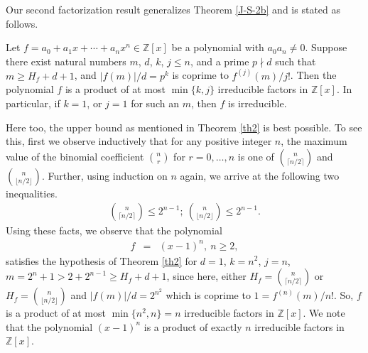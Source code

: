 \documentclass[12pt,reqno]{amsart}%
\begin{document}
Our second factorization result generalizes Theorem \ref{J-S-2b} and is stated as follows.
\begin{theorem}\label{th2}
Let $f=a_0+a_1x+\cdots +a_nx^n\in \mathbb Z[x]$ be a polynomial with $a_0a_n\neq 0$. Suppose there exist  natural numbers $m$, $d$, $k$, $j\leq n$, and a prime $p\nmid d$ such that $m\geq H_f+d+1$, and $|f(m)|/d=p^k$ is coprime to $f^{(j)}(m)/j!$. Then the polynomial $f$ is a product of at most $\min\{k,j\}$  irreducible factors in $\mathbb Z[x]$.  In particular,  if $k=1$, or $j=1$ for such an $m$, then $f$ is irreducible.
\end{theorem}
Here too, the upper bound as mentioned in Theorem \ref{th2} is best possible. To see this, first we observe inductively that for any positive integer $n$, the maximum value of the binomial coefficient $n\choose r$ for $r=0,\ldots,n$ is one of ${n\choose \lceil n/2\rceil}$ and ${n\choose \lfloor n/2\rfloor}$. Further, using induction on $n$ again, we arrive at the following two inequalities.
\begin{eqnarray*}
{n\choose \lceil n/2\rceil}\leq 2^{n-1};~{n\choose \lfloor n/2\rfloor}\leq 2^{n-1}.
\end{eqnarray*}
Using these facts, we observe that the polynomial
\begin{eqnarray*}
f &=&  (x-1)^n,~n\geq 2,
\end{eqnarray*}
satisfies the hypothesis of Theorem \ref{th2} for $d=1$, $k=n^2$, $j=n$,
$m=2^n+1>2+2^{n-1}\geq H_f+d+1$, since here,
either $H_f={n\choose \lceil n/2\rceil}$  or $H_f={n\choose \lfloor n/2\rfloor}$ and $|f(m)|/d=2^{n^2}$ which is coprime to $1=f^{(n)}(m)/n!$. So, $f$ is a product of at most $\min\{n^2,n\}=n$ irreducible factors in $\mathbb{Z}[x]$. We note that the polynomial $(x-1)^n$ is a product of exactly $n$ irreducible factors in $\mathbb{Z}[x]$.
\end{document}

